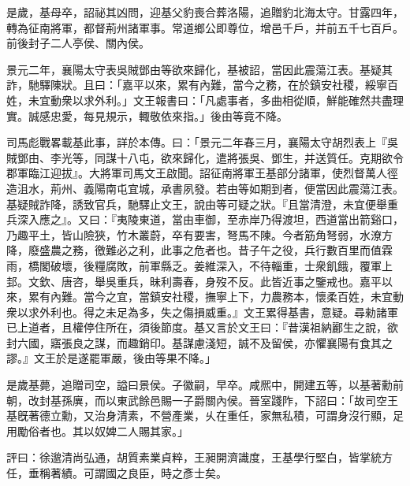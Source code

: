 \begin{pinyinscope}
是歲，基母卒，詔祕其凶問，迎基父豹喪合葬洛陽，追贈豹北海太守。甘露四年，轉為征南將軍，都督荊州諸軍事。常道鄉公即尊位，增邑千戶，并前五千七百戶。前後封子二人亭侯、關內侯。

景元二年，襄陽太守表吳賊鄧由等欲來歸化，基被詔，當因此震蕩江表。基疑其詐，馳驛陳狀。且曰：「嘉平以來，累有內難，當今之務，在於鎮安社稷，綏寧百姓，未宜動衆以求外利。」文王報書曰：「凡處事者，多曲相從順，鮮能確然共盡理實。誠感忠愛，每見規示，輙敬依來指。」後由等竟不降。

司馬彪戰畧載基此事，詳於本傳。曰：「景元二年春三月，襄陽太守胡烈表上『吳賊鄧由、李光等，同謀十八屯，欲來歸化，遣將張吳、鄧生，并送質任。克期欲令郡軍臨江迎拔』。大將軍司馬文王啟聞。詔征南將軍王基部分諸軍，使烈督萬人徑造沮水，荊州、義陽南屯宜城，承書夙發。若由等如期到者，便當因此震蕩江表。基疑賊詐降，誘致官兵，馳驛止文王，說由等可疑之狀。『且當清澄，未宜便舉重兵深入應之』。又曰：『夷陵東道，當由車御，至赤岸乃得渡坦，西道當出箭谿口，乃趣平土，皆山險狹，竹木叢蔚，卒有要害，弩馬不陳。今者筋角弩弱，水潦方降，廢盛農之務，徼難必之利，此事之危者也。昔子午之役，兵行數百里而值霖雨，橋閣破壞，後糧腐敗，前軍縣乏。姜維深入，不待輜重，士衆飢餓，覆軍上邽。文欽、唐咨，舉吳重兵，昧利壽春，身歿不反。此皆近事之鑒戒也。嘉平以來，累有內難。當今之宜，當鎮安社稷，撫寧上下，力農務本，懷柔百姓，未宜動衆以求外利也。得之未足為多，失之傷損威重。』文王累得基書，意疑。尋勑諸軍已上道者，且權停住所在，須後節度。基又言於文王曰：『昔漢祖納酈生之說，欲封六國，寤張良之謀，而趣銷印。基謀慮淺短，誠不及留侯，亦懼襄陽有食其之謬。』文王於是遂罷軍嚴，後由等果不降。」

是歲基薨，追贈司空，謚曰景侯。子徽嗣，早卒。咸熈中，開建五等，以基著勳前朝，改封基孫廙，而以東武餘邑賜一子爵關內侯。晉室踐阼，下詔曰：「故司空王基旣著德立勳，又治身清素，不營產業，乆在重任，家無私積，可謂身沒行顯，足用勵俗者也。其以奴婢二人賜其家。」

評曰：徐邈清尚弘通，胡質素業貞粹，王昶開濟識度，王基學行堅白，皆掌統方任，垂稱著績。可謂國之良臣，時之彥士矣。


\end{pinyinscope}